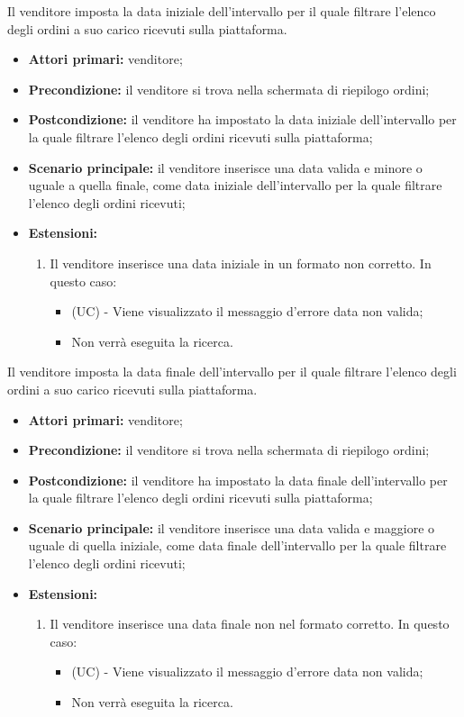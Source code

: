 \resetSubUC
{}
Il venditore imposta la data iniziale dell'intervallo per il quale filtrare l'elenco degli ordini a suo carico ricevuti sulla piattaforma.
\begin{itemize}
	\item \textbf{Attori primari:} venditore;
	\item \textbf{Precondizione:} il venditore si trova nella schermata di riepilogo ordini;
	\item \textbf{Postcondizione:} il venditore ha impostato la data iniziale dell'intervallo per la quale filtrare l'elenco degli ordini ricevuti sulla piattaforma;
	\item \textbf{Scenario principale:} il venditore inserisce una data valida e minore o uguale a quella finale, come data iniziale dell'intervallo per la quale filtrare l'elenco degli ordini ricevuti;
	\item \textbf{Estensioni:}
	\begin{enumerate}[label=\lett]
		\item Il venditore inserisce una data iniziale in un formato non corretto. In questo caso:
		\begin{itemize}
			\item (UC) - Viene visualizzato il messaggio d'errore data non valida;
			\item Non verrà eseguita la ricerca.
		\end{itemize} 
	\end{enumerate}
\end{itemize}

Il venditore imposta la data finale dell'intervallo per il quale filtrare l'elenco degli ordini a suo carico ricevuti sulla piattaforma.
\begin{itemize}
	\item \textbf{Attori primari:} venditore;
	\item \textbf{Precondizione:} il venditore si trova nella schermata di riepilogo ordini;
	\item \textbf{Postcondizione:} il venditore ha impostato la data finale dell'intervallo per la quale filtrare l'elenco degli ordini ricevuti sulla piattaforma;
	\item \textbf{Scenario principale:} il venditore inserisce una data valida e maggiore o uguale di quella iniziale, come data finale dell'intervallo per la quale filtrare l'elenco degli ordini ricevuti;
	\item \textbf{Estensioni:}
	\begin{enumerate}[label=\lett]
		\item Il venditore inserisce una data finale non nel formato corretto. In questo caso:
		\begin{itemize}
			\item (UC) - Viene visualizzato il messaggio d'errore data non valida;
			\item Non verrà eseguita la ricerca.
		\end{itemize}
	\end{enumerate}
\end{itemize}